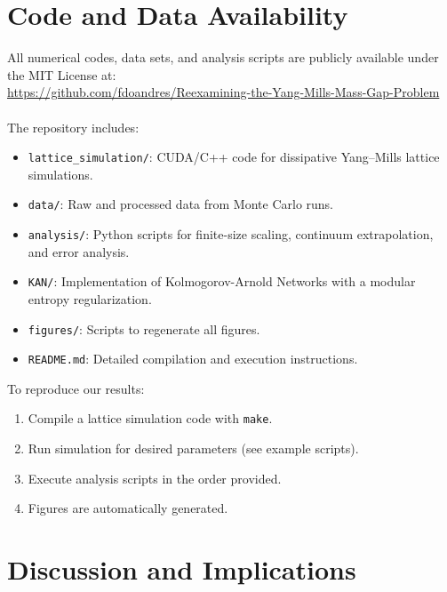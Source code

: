 \documentclass[aps,prd,reprint,superscriptaddress,floatfix]{revtex4-2}
\newcommand{\code}[1]{\texttt{#1}}
\begin{document}
\section{Code and Data Availability}
\label{sec:code}

All numerical codes, data sets, and analysis scripts are publicly available under the MIT License at:\\

\url{https://github.com/fdoandres/Reexamining-the-Yang-Mills-Mass-Gap-Problem}\\
\\
The repository includes:
\begin{itemize}
    \item \code{lattice\_simulation/}: CUDA/C++ code for dissipative Yang--Mills lattice simulations.
    \item \code{data/}: Raw and processed data from Monte Carlo runs.
    \item \code{analysis/}: Python scripts for finite-size scaling, continuum extrapolation, and error analysis.
    \item \code{KAN/}: Implementation of Kolmogorov-Arnold Networks with a modular entropy regularization.
    \item \code{figures/}: Scripts to regenerate all figures.
    \item \texttt{README.md}: Detailed compilation and execution instructions.
\end{itemize}

To reproduce our results:
\begin{enumerate}
    \item Compile a lattice simulation code with \code{make}.
    \item Run simulation for desired parameters (see example scripts).
    \item Execute analysis scripts in the order provided.
    \item Figures are automatically generated.
\end{enumerate}

\section{Discussion and Implications}
\label{sec:discussion}
\end{document}
